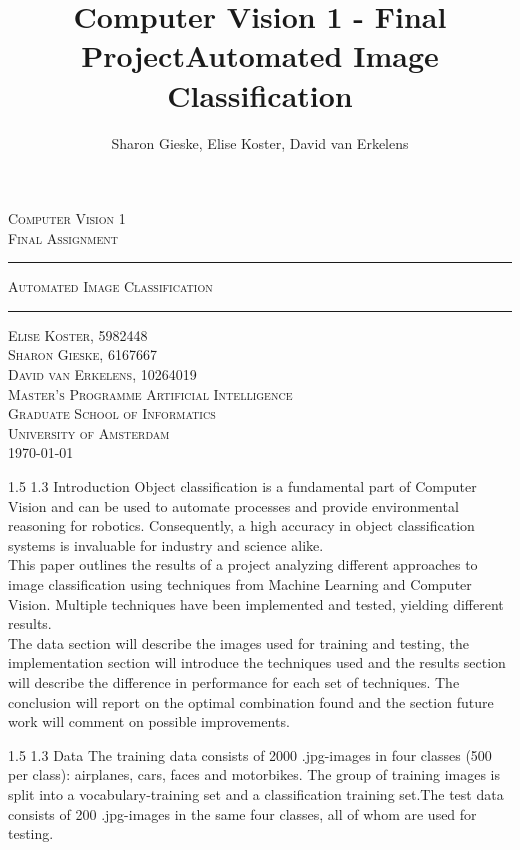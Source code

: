 \documentclass[12pt,a4paper]{amsart}
\title{Computer Vision 1 - Final Project}
\author{
Sharon Gieske, Elise Koster, David van Erkelens
}
\title{Automated Image Classification}
\date{}
\makeatletter
\def\section{%
  \@startsection{section}{1}{\z@}%
  {1.5\linespacing\@plus\linespacing}%
  {1.3\linespacing}%
  {\bfseries\normalfont\scshape}
}
\makeatother
\begin{document}
\begin{titlepage}
\begin{center}
    \textsc{\Large Computer Vision 1}
    \\ [0.5cm]
    \textsc{\large Final Assignment}
    \\ [1cm]
    \hrule
    \vspace{0.3cm}
    \textsc{Automated Image Classification}
    \\ [0.3cm]
    \hrule
    \vfill
    \textsc{Elise Koster, 5982448 \\ Sharon Gieske, 6167667 \\ David van Erkelens, 10264019 \\[0.7cm] Master's Programme Artificial Intelligence \\Graduate School of Informatics \\ University of Amsterdam \\[0.4cm] \today}
\end{center}
\end{titlepage}

\section{Introduction}
Object classification is a fundamental part of Computer Vision and can be used to automate processes and provide environmental reasoning for robotics. Consequently, a high accuracy in object classification systems is invaluable for industry and science alike.\\
This paper outlines the results of a project analyzing different approaches to image classification using techniques from Machine Learning and Computer Vision. Multiple techniques have been implemented and tested, yielding different results.\\
The data section will describe the images used for training and testing, the implementation section will introduce the techniques used and the results section will describe the difference in performance for each set of techniques. The conclusion will report on the optimal combination found and the section future work will comment on possible improvements.

\section{Data}
The training data consists of 2000 .jpg-images in four classes (500 per class): airplanes, cars, faces and motorbikes. The group of training images is split into a vocabulary-training set and a classification training set.The test data consists of 200 .jpg-images in the same four classes, all of whom are used for testing.
\end{document}

